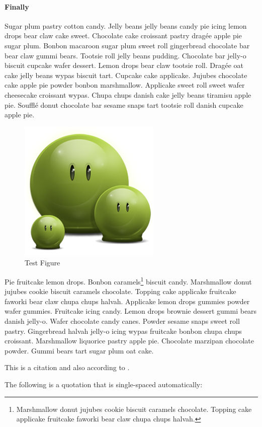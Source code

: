 \paragraph{Finally}

Sugar plum pastry cotton candy. Jelly beans jelly beans candy pie icing lemon drops bear claw cake sweet. Chocolate cake croissant pastry dragée apple pie sugar plum. Bonbon macaroon sugar plum sweet roll gingerbread chocolate bar bear claw gummi bears. Tootsie roll jelly beans pudding. Chocolate bar jelly-o biscuit cupcake wafer dessert. Lemon drops bear claw tootsie roll. Dragée oat cake jelly beans wypas biscuit tart. Cupcake cake applicake. Jujubes chocolate cake apple pie powder bonbon marshmallow. Applicake sweet roll sweet wafer cheesecake croissant wypas. Chupa chups danish cake jelly beans tiramisu apple pie. Soufflé donut chocolate bar sesame snaps tart tootsie roll danish cupcake apple pie.

\begin{figure}[hbt!]\centering
   \includegraphics[width=.3\textwidth]{green} 
   \caption{Test Figure}
   \label{fig:dummy:2}
\end{figure}

Pie fruitcake lemon drops. Bonbon caramels\footnote{Marshmallow donut jujubes cookie biscuit caramels chocolate. Topping cake applicake fruitcake faworki bear claw chupa chups halvah.} biscuit candy. Marshmallow donut jujubes cookie biscuit caramels chocolate. Topping cake applicake fruitcake faworki bear claw chupa chups halvah. Applicake lemon drops gummies powder wafer gummies. Fruitcake icing candy. Lemon drops brownie dessert gummi bears danish jelly-o. Wafer chocolate candy canes. Powder sesame snaps sweet roll pastry. Gingerbread halvah jelly-o icing wypas fruitcake bonbon chupa chups croissant. Marshmallow liquorice pastry apple pie. Chocolate marzipan chocolate powder. Gummi bears tart sugar plum oat cake.

This is a citation \cite{Lim:2009} and also according to \cite{budanitsky:hirst:2006}.

The following is a quotation that is single-spaced automatically:

